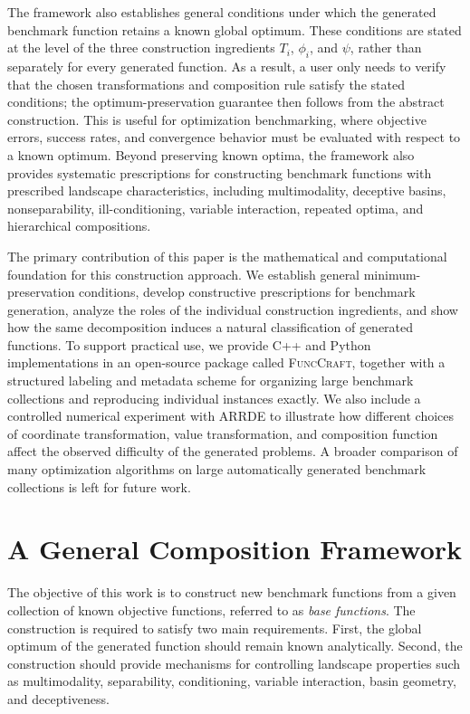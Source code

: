 \documentclass[journal]{IEEEtran}
\theoremstyle{remark}
\theoremstyle{plain}
\begin{document}
The framework also establishes general conditions under which the generated
benchmark function retains a known global optimum. These conditions are stated
at the level of the three construction ingredients \(T_i\), \(\phi_i\), and
\(\psi\), rather than separately for every generated function. As a result, a
user only needs to verify that the chosen transformations and composition rule
satisfy the stated conditions; the optimum-preservation guarantee then follows
from the abstract construction. This is useful for optimization benchmarking,
where objective errors, success rates, and convergence behavior must be
evaluated with respect to a known optimum. Beyond preserving known optima, the
framework also provides systematic prescriptions for constructing benchmark
functions with prescribed landscape characteristics, including multimodality,
deceptive basins, nonseparability, ill-conditioning, variable interaction,
repeated optima, and hierarchical compositions.

The primary contribution of this paper is the mathematical and computational
foundation for this construction approach. We establish general
minimum-preservation conditions, develop constructive prescriptions for
benchmark generation, analyze the roles of the individual construction
ingredients, and show how the same decomposition induces a natural
classification of generated functions. To support practical use, we provide C++
and Python implementations in an open-source package called
\textsc{FuncCraft}, together with a structured labeling and metadata scheme for
organizing large benchmark collections and reproducing individual instances
exactly. We also include a controlled numerical experiment with ARRDE to
illustrate how different choices of coordinate transformation, value
transformation, and composition function affect the observed difficulty of the
generated problems. A broader comparison of many optimization algorithms on
large automatically generated benchmark collections is left for future work.


\section{A General Composition Framework}
\label{sec:general-composition}

The objective of this work is to construct new benchmark functions from a
given collection of known objective functions, referred to as
\emph{base functions}. The construction is required to satisfy two main
requirements. First, the global optimum of the generated function should remain
known analytically. Second, the construction should provide mechanisms for
controlling landscape properties such as multimodality, separability,
conditioning, variable interaction, basin geometry, and deceptiveness.
\end{document}
